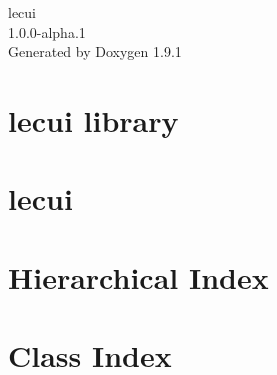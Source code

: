 \let\mypdfximage\pdfximage\def\pdfximage{\immediate\mypdfximage}\documentclass[twoside]{book}
\newcommand{\+}{\discretionary{\mbox{\scriptsize$\hookleftarrow$}}{}{}}
\newcommand{\clearemptydoublepage}{%
  \newpage{\pagestyle{empty}\cleardoublepage}%
}
\begin{document}
\raggedbottom

\hypersetup{pageanchor=false,
             bookmarksnumbered=true,
             pdfencoding=unicode
            }
\begin{titlepage}
\vspace*{7cm}
\begin{center}%
{\Large lecui \\[1ex]\large 1.\+0.\+0-\/alpha.\+1 }\\
\vspace*{1cm}
{\large Generated by Doxygen 1.9.1}\\
\end{center}
\end{titlepage}
\clearemptydoublepage
{}
\tableofcontents
\clearemptydoublepage
{}
\hypersetup{pageanchor=true}

\chapter{lecui library}
\label{md__l_i_c_e_n_s_e}

\chapter{lecui}
\label{md__r_e_a_d_m_e}

\chapter{Hierarchical Index}

\chapter{Class Index}

\end{document}
